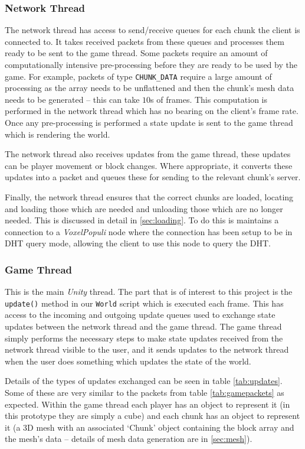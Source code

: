 \documentclass[12pt,notitlepage,a4paper]{report}
\newcommand{\unity}{\emph{Unity}}
\newcommand{\voxpop}{\emph{VoxelPopuli}}
\begin{document}
	\subsubsection{Network Thread}
	\label{sec:nthread}
	The network thread has access to send/receive queues for each chunk the client is connected to. It takes received packets from these queues and processes them ready to be sent to the game thread. Some packets require an amount of computationally intensive pre-processing before they are ready to be used by the game. For example, packets of type \texttt{CHUNK\_DATA} require a large amount of processing as the array needs to be unflattened and then the chunk's mesh data needs to be generated -- this can take $10$s of frames. This computation is performed in the network thread which has no bearing on the client's frame rate. Once any pre-processing is performed a state update is sent to the game thread which is rendering the world.
	
	The network thread also receives updates from the game thread, these updates can be player movement or block changes. Where appropriate, it converts these updates into a packet and queues these for sending to the relevant chunk's server.
	
	Finally, the network thread ensures that the correct chunks are loaded, locating and loading those which are needed and unloading those which are no longer needed. This is discussed in detail in \cref{sec:loading}. To do this is maintains a connection to a \voxpop{} node where the connection has been setup to be in DHT query mode, allowing the client to use this node to query the DHT.
	
	\subsubsection{Game Thread}
	\label{sec:gamethread}
	This is the main \unity{} thread. The part that is of interest to this project is the \texttt{update()} method in our \texttt{World} script which is executed each frame. This has access to the incoming and outgoing update queues used to exchange state updates between the network thread and the game thread. The game thread simply performs the necessary steps to make state updates received from the network thread visible to the user, and it sends updates to the network thread when the user does something which updates the state of the world.
	
	Details of the types of updates exchanged can be seen in table \ref{tab:updates}. Some of these are very similar to the packets from table \ref{tab:gamepackets} as expected. Within the game thread each player has an object to represent it (in this prototype they are simply a cube) and each chunk has an object to represent it (a 3D mesh with an associated `Chunk' object containing the block array and the mesh's data -- details of mesh data generation are in \cref{sec:mesh}).
	
\end{document}
